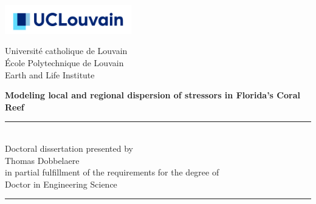 \thispagestyle{empty}
\begin{minipage}[b]{0.3\textwidth}
\hspace*{-0.8cm}\includegraphics[width=5.5cm]{./figures/logo_ucl.jpg}\vspace{0.1cm}
\end{minipage}
\begin{minipage}[b]{0.69\textwidth}
	\begin{center}
	\hspace*{0.5cm}Université catholique de Louvain\\
	\hspace*{0.5cm}\'Ecole Polytechnique de Louvain\\
	\hspace*{0.5cm} Earth and Life Institute\\
	\end{center}
\end{minipage}


\vspace*{2cm}
\hspace{-0.8cm}
\begin{minipage}{1.02\linewidth}
\centering
\LARGE\bfseries Modeling local and regional dispersion of stressors in Florida's Coral Reef
\end{minipage}


\vspace*{0.5cm}
\hspace{-0.5cm}\begin{minipage}{\textwidth}
\centering
\rule{50pt}{.5pt}\\[1.2ex]
Doctoral dissertation presented by \\ [2.ex]
{\Large Thomas Dobbelaere\\ [2.ex]
}
in partial fulfillment of the requirements for the degree of\\ [2.ex]
\Large Doctor in Engineering Science

\rule{50pt}{.5pt}\\
\end{minipage}

